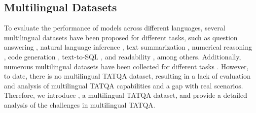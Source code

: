\subsection{Multilingual Datasets}
To evaluate the performance of models across different languages, several multilingual datasets have been proposed for different tasks, such as question answering \cite{liu-etal-2019-xqa,clark-etal-2020-tydiQA,longpre-etal-2021-mkqa}, natural language inference \cite{conneau-etal-2018-xnli}, text summarization \cite{giannakopoulos-etal-2015-multiling-Summarization,ladhak-etal-2020-wikilingua,scialom-etal-2020-mlsum}, numerical reasoning \cite{shi2023MGSM}, code generation \cite{peng-etal-2024-humanevalxl}, text-to-SQL \cite{MultiSpider}, and readability \cite{trokhymovych-etal-2024-open-Readability,naous-etal-2024-readme}, among others. 
Additionally, numerous multilingual datasets have been collected for different tasks \cite{hu-2020-XTREME,ruder-etal-2021-xtremer,zhang2024pmmeval-multitask,singh-etal-2024-indicgenbench}. 
However, to date, there is no multilingual TATQA dataset, resulting in a lack of evaluation and analysis of multilingual TATQA capabilities and a gap with real scenarios. 
Therefore, we introduce \ourdataset, a multilingual TATQA dataset, and provide a detailed analysis of the challenges in multilingual TATQA.

